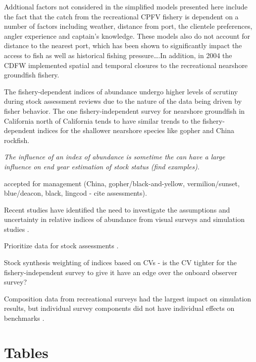 \documentclass[
  12pt,
  authoryear,
  preprint,
  3p]{elsarticle}
\begin{document}
Addtional factors not considered in the simplified models presented here
include the fact that the catch from the recreational CPFV fishery is
dependent on a number of factors including weather, distance from port,
the clientele preferences, angler experience and captain's knowledge.
These models also do not account for distance to the nearest port, which
has been shown to significantly impact the access to fish as well as
historical fishing pressure\ldots.In addition, in 2004 the CDFW
implemented spatial and temporal closures to the recreational nearshore
groundfish fishery.

The fishery-dependent indices of abundance undergo higher levels of
scrutiny during stock assessment reviews due to the nature of the data
being driven by fisher behavior. The one fishery-independent survey for
nearshore groundfish in California north of California tends to have
similar trends to the fishery-dependent indices for the shallower
nearshore species like gopher and China rockfish.

\emph{The influence of an index of abundance is sometime the can have a
large influence on end year estimation of stock status (find examples).}

accepted for management (China, gopher/black-and-yellow,
vermilion/sunset, blue/deacon, black, lingcod - cite assessments).

Recent studies have identified the need to investigate the assumptions
and uncertainty in relative indices of abundance from visual surveys
\citep{Bacheler:2015:ERA, Campbell:2015:CRA} and simulation studies
\citep{Siegfried:2016:ISA}.

Prioritize data for stock assessments \citep{Magnusson:2007:WMF}.

Stock synthesis weighting of indices based on CVs - is the CV tighter
for the fishery-independent survey to give it have an edge over the
onboard observer survey?

Composition data from recreational surveys had the largest impact on
simulation results, but individual survey components did not have
individual effects on benchmarks \citep{Siegfried:2016:ISA}.

\hypertarget{tables}{%
\section{Tables}\label{tables}}

\FloatBarrier
\end{document}
